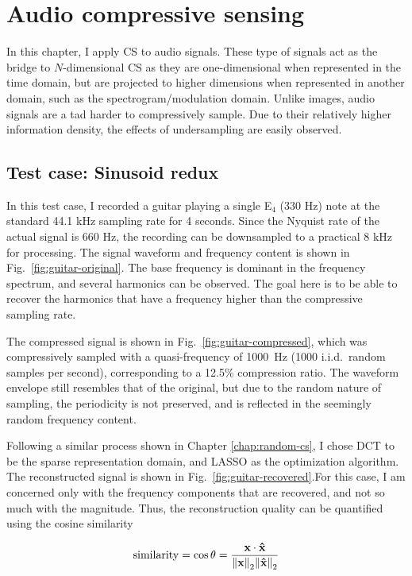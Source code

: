 \chapter{Audio compressive sensing}
\label{chap:audio-cs}
In this chapter, I apply CS to audio signals. These type of signals act as the bridge to $N$-dimensional CS as they are one-dimensional when represented in the time domain, but are projected to higher dimensions when represented in another domain, such as the spectrogram/modulation domain. Unlike images, audio signals are a tad harder to compressively sample. Due to their relatively higher information density, the effects of undersampling are easily observed.

\section{Test case: Sinusoid redux}
\label{sec:audio-sine}
In this test case, I recorded a guitar playing a single E$_4$ (330 Hz) note at the standard 44.1 kHz sampling rate for 4 seconds. Since the Nyquist rate of the actual signal is 660 Hz, the recording can be downsampled to a practical 8 kHz for processing. The signal waveform and frequency content is shown in Fig.~\ref{fig:guitar-original}. The base frequency is dominant in the frequency spectrum, and several harmonics can be observed. The goal here is to be able to recover the harmonics that have a frequency higher than the compressive sampling rate.

The compressed signal is shown in Fig.~\ref{fig:guitar-compressed}, which was compressively sampled with a quasi-frequency of 1000~Hz (1000 i.i.d.~random samples per second), corresponding to a 12.5\% compression ratio. The waveform envelope still resembles that of the original, but due to the random nature of sampling, the periodicity is not preserved, and is reflected in the seemingly random frequency content.

Following a similar process shown in Chapter \ref{chap:random-cs}, I chose DCT to be the sparse representation domain, and LASSO as the optimization algorithm. The reconstructed signal is shown in Fig.~\ref{fig:guitar-recovered}.For this case, I am concerned only with the frequency components that are recovered, and not so much with the magnitude. Thus, the reconstruction quality can be quantified using the cosine similarity

\begin{equation}
	\label{eq:cossim}
	\mathrm{similarity} = \cos\theta = \frac{\text{\bfseries x} \cdot \bm\hat{\text{\bfseries x}}}{\norm{\text{\bfseries x}}_2 \norm{\bm\hat{\text{\bfseries x}}}_2}
\end{equation}

